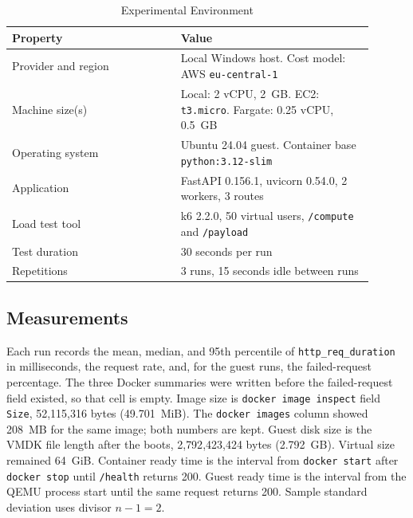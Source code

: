 \documentclass[conference,a4paper]{IEEEtran}
\begin{document}
\begin{table}[htbp]
	\caption{Experimental Environment}
	\label{tab:environment}
	\begin{center}
		\footnotesize
		\begin{tabular}{|p{0.42\linewidth}|p{0.48\linewidth}|}
			\hline
			\textbf{Property} & \textbf{Value} \\
			\hline
			Provider and region & Local Windows host. Cost model: AWS \texttt{eu-central-1} \\
			\hline
			Machine size(s) & Local: 2 vCPU, 2~GB. EC2: \texttt{t3.micro}. Fargate: 0.25 vCPU, 0.5~GB \\
			\hline
			Operating system & Ubuntu 24.04 guest. Container base \texttt{python:3.12-slim} \\
			\hline
			Application & FastAPI 0.156.1, uvicorn 0.54.0, 2 workers, 3 routes \\
			\hline
			Load test tool & k6 2.2.0, 50 virtual users, \texttt{/compute} and \texttt{/payload} \\
			\hline
			Test duration & 30 seconds per run \\
			\hline
			Repetitions & 3 runs, 15 seconds idle between runs \\
			\hline
		\end{tabular}
	\end{center}
\end{table}

\subsection{Measurements}

Each run records the mean, median, and 95th percentile of \texttt{http\_req\_duration} in milliseconds, the request rate, and, for the guest runs, the failed-request percentage. The three Docker summaries were written before the failed-request field existed, so that cell is empty. Image size is \texttt{docker image inspect} field \texttt{Size}, 52{,}115{,}316 bytes (49.701~MiB). The \texttt{docker images} column showed 208~MB for the same image; both numbers are kept. Guest disk size is the VMDK file length after the boots, 2{,}792{,}423{,}424 bytes (2.792~GB). Virtual size remained 64~GiB. Container ready time is the interval from \texttt{docker start} after \texttt{docker stop} until \texttt{/health} returns 200. Guest ready time is the interval from the QEMU process start until the same request returns 200. Sample standard deviation uses divisor \(n-1=2\).
\end{document}
